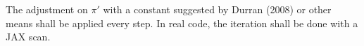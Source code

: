 \documentclass[a4paper,11pt]{article}
\begin{document}
The adjustment on $\pi'$ with a constant suggested by Durran (2008) or other means shall be applied every step. In real code, the iteration shall be done with a JAX \textsf{scan}.



  


% 
\end{document}
